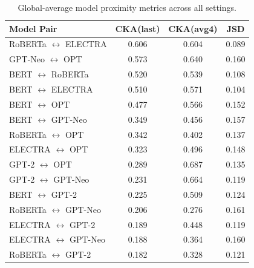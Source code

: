 \begin{table}[!ht]
\centering
\footnotesize
\setlength{\tabcolsep}{3pt}
\begin{tabular}{lccc}
\toprule
\textbf{Model Pair} & \textbf{CKA(last)} & \textbf{CKA(avg4)} & \textbf{JSD} \\
\midrule
RoBERTa $\leftrightarrow$ ELECTRA & 0.606 & 0.604 & 0.089 \\
GPT-Neo $\leftrightarrow$ OPT & 0.573 & 0.640 & 0.160 \\
BERT $\leftrightarrow$ RoBERTa & 0.520 & 0.539 & 0.108 \\
BERT $\leftrightarrow$ ELECTRA & 0.510 & 0.571 & 0.104 \\
BERT $\leftrightarrow$ OPT & 0.477 & 0.566 & 0.152 \\
BERT $\leftrightarrow$ GPT-Neo & 0.349 & 0.456 & 0.157 \\
RoBERTa $\leftrightarrow$ OPT & 0.342 & 0.402 & 0.137 \\
ELECTRA $\leftrightarrow$ OPT & 0.323 & 0.496 & 0.148 \\
GPT-2 $\leftrightarrow$ OPT & 0.289 & 0.687 & 0.135 \\
GPT-2 $\leftrightarrow$ GPT-Neo & 0.231 & 0.664 & 0.119 \\
BERT $\leftrightarrow$ GPT-2 & 0.225 & 0.509 & 0.124 \\
RoBERTa $\leftrightarrow$ GPT-Neo & 0.206 & 0.276 & 0.161 \\
ELECTRA $\leftrightarrow$ GPT-2 & 0.189 & 0.448 & 0.119 \\
ELECTRA $\leftrightarrow$ GPT-Neo & 0.188 & 0.364 & 0.160 \\
RoBERTa $\leftrightarrow$ GPT-2 & 0.182 & 0.328 & 0.121 \\
\bottomrule
\end{tabular}
\caption{Global-average model proximity metrics across all settings.}
\label{tab:proximity}
\end{table}